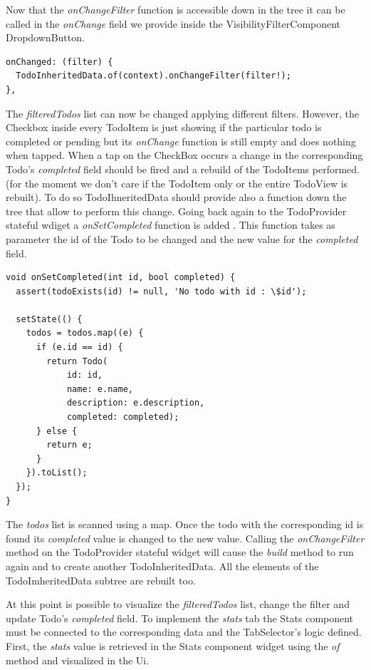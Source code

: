 Now that the \textit{onChangeFilter   }function is accessible down in the tree it can be called in the \textit{onChange }field we provide inside the VisibilityFilterComponent DropdownButton.
\mbox{}\\


\begin{verbatim}
onChanged: (filter) {
  TodoInheritedData.of(context).onChangeFilter(filter!);
},
\end{verbatim}

The \textit{filteredTodos} list can now be changed applying different filters. However, the Checkbox inside every TodoItem is just showing if the particular todo is completed or pending but its \textit{onChange   }function is still empty and does nothing when tapped. When a tap on the CheckBox occurs a change in the corresponding Todo’s \textit{completed }field should be fired and a rebuild of the TodoItems performed. (for the moment we don’t care if the TodoItem only or the entire TodoView is rebuilt). To do so TodoIhneritedData should provide also a function down the tree that allow to perform this change. Going back again to the TodoProvider stateful wdiget a \textit{onSetCompleted  }function is added . This function takes as parameter the id of the Todo to be changed and the new value for the \textit{completed }field.
\mbox{}\\


\begin{verbatim}
void onSetCompleted(int id, bool completed) {
  assert(todoExists(id) != null, 'No todo with id : \$id');

  setState(() {
    todos = todos.map((e) {
      if (e.id == id) {
        return Todo(
            id: id,
            name: e.name,
            description: e.description,
            completed: completed);
      } else {
        return e;
      }
    }).toList();
  });
}
\end{verbatim}

The \textit{todos }list is scanned using a map. Once the todo with the corresponding id is found its \textit{completed }value is changed to the new value. Calling the \textit{onChangeFilter }method on the TodoProvider stateful widget will cause the \textit{build}  method to run again and to create another TodoInheritedData. All the elements of the TodoImheritedData subtree are rebuilt too.

At this point is possible to visualize the \textit{filteredTodos} list, change the filter and update Todo’s \textit{completed }field. To implement the \textit{stats} tab the Stats component must be connected to the corresponding data and  the TabSelector’s logic defined. First, the \textit{stats} value is retrieved in the Stats component widget using the \textit{of} method and visualized in the Ui.

